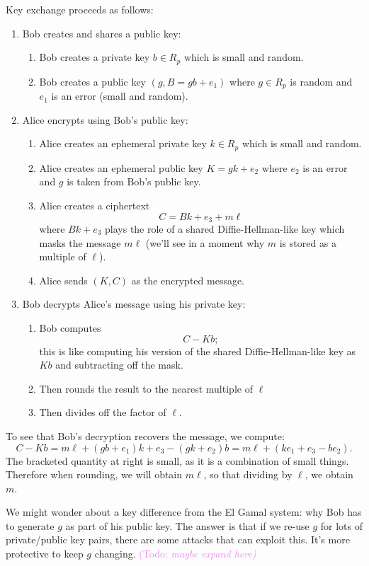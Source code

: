 \documentclass{article}
\theoremstyle{plain}
\theoremstyle{definition}
\theoremstyle{remark}
\numberwithin{theorem}{section}
\newcommand{\KS}[1]{\textcolor{violet}{{\sf (Todo:} {\sl{#1})}}}
\newcommand{\KS}[1]{}
\begin{document}
Key exchange proceeds as follows:
\begin{enumerate}
\item Bob creates and shares a public key:
\begin{enumerate}
\item Bob creates a private key $b \in R_p$ which is small and random.
\item Bob creates a public key $(g, B = gb + e_1)$ where $g \in R_p$ is random and $e_1$ is an error (small and random).
\end{enumerate}
\item Alice encrypts using Bob's public key:
\begin{enumerate}
\item Alice creates an ephemeral private key $k \in R_p$ which is small and random.
\item Alice creates an ephemeral public key $K = gk + e_2$ where $e_2$ is an error and $g$ is taken from Bob's public key.
\item Alice creates a ciphertext
\[
C = Bk + e_3 + m\ell
\]
where $Bk+e_3$ plays the role of a shared Diffie-Hellman-like key which masks the message $m\ell$ (we'll see in a moment why $m$ is stored as a multiple of $\ell$).
\item Alice sends $(K,C)$ as the encrypted message.
\end{enumerate}
\item Bob decrypts Alice's message using his private key:
\begin{enumerate}
\item Bob computes
\[
C - Kb;
\]
this is like computing his version of the shared Diffie-Hellman-like key as $Kb$ and subtracting off the mask.
\item Then rounds the result to the nearest multiple of $\ell$
\item Then divides off the factor of $\ell$.
\end{enumerate}
\end{enumerate}

To see that Bob's decryption recovers the message, we compute:
\[
C - Kb = m\ell + (g b + e_1) k + e_3 - (gk + e_2) b
= m \ell + (ke_1 + e_3 - be_2).
\]
The bracketed quantity at right is small, as it is a combination of small things.  Therefore when rounding, we will obtain $m\ell$, so that dividing by $\ell$, we obtain $m$.

We might wonder about a key difference from the El Gamal system:  why Bob has to generate $g$ as part of his public key.  The answer is that if we re-use $g$ for lots of private/public key pairs, there are some attacks that can exploit this.  It's more protective to keep $g$ changing. \KS{maybe expand here}
\end{document}
